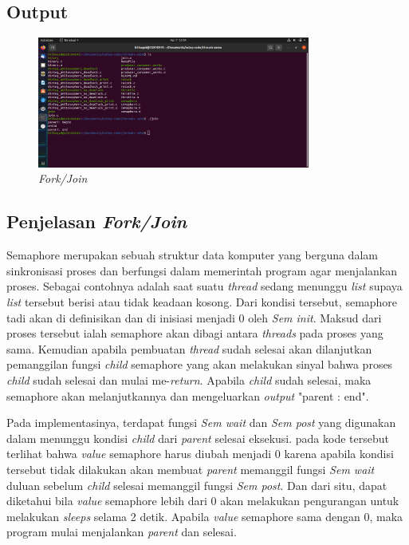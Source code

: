 \documentclass[11pt,a4paper]{article}
\begin{document}
\subsection{Output}
\begin{figure}[h]
	\centering
	\includegraphics[width=0.8\textwidth]{Figure1/fork.png}
	\caption{\textit{Fork/Join}}
\end{figure}

\subsection{Penjelasan \textit{Fork/Join}} 
Semaphore merupakan sebuah struktur data komputer yang berguna dalam sinkronisasi proses dan berfungsi dalam memerintah program agar menjalankan proses.
Sebagai contohnya adalah saat suatu \textit{thread} sedang menunggu \textit{list} supaya \textit{list} tersebut berisi atau tidak keadaan kosong. Dari kondisi tersebut, 
semaphore tadi akan di definisikan dan di inisiasi menjadi 0 oleh \textit{Sem init}. Maksud dari proses tersebut ialah semaphore akan dibagi antara \textit{threads} pada proses
yang sama. Kemudian apabila pembuatan \textit{thread} sudah selesai akan dilanjutkan pemanggilan fungsi \textit{child} semaphore yang akan melakukan sinyal bahwa 
proses \textit{child} sudah selesai dan mulai me-\textit{return}. Apabila \textit{child} sudah selesai, maka semaphore akan melanjutkannya dan mengeluarkan \textit{output} 
"parent : end". \par
Pada implementasinya, terdapat fungsi \textit{Sem wait} dan \textit{Sem post} yang digunakan dalam menunggu kondisi \textit{child} dari \textit{parent} selesai eksekusi.
pada kode tersebut terlihat bahwa \textit{value} semaphore harus diubah menjadi 0 karena apabila kondisi tersebut tidak dilakukan akan membuat \textit{parent} memanggil fungsi 
\textit{Sem wait} duluan sebelum \textit{child} selesai memanggil fungsi \textit{Sem post}. Dan dari situ, dapat diketahui bila \textit{value} semaphore lebih dari 0 akan melakukan pengurangan 
untuk melakukan \textit{sleeps} selama 2 detik. Apabila \textit{value} semaphore sama dengan 0, maka program mulai menjalankan \textit{parent} dan selesai.
\end{document}

